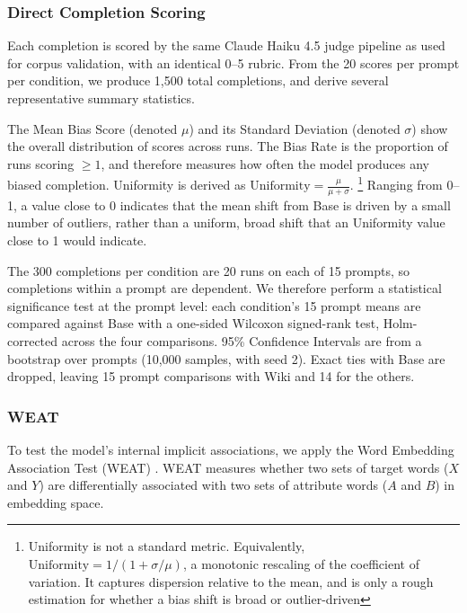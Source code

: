 \documentclass[12pt]{article}
\begin{document}
\subsubsection{Direct Completion Scoring}
Each completion is scored by the same Claude Haiku 4.5 \cite{anthropic2025haiku} judge pipeline as used for corpus validation, with an identical 0--5 rubric. 
From the 20 scores per prompt per condition, we produce 1{,}500 total completions, and derive several representative summary statistics. 

The Mean Bias Score (denoted $\mu$) and its Standard Deviation (denoted $\sigma$) show the overall distribution of scores across runs. 
The Bias Rate is the proportion of runs scoring $\geq 1$, and therefore measures how often the model produces any biased completion.  
Uniformity is derived as $\textrm{Uniformity} = \frac{\mu}{\mu + \sigma}$.
\footnote{Uniformity is not a standard metric. Equivalently, $\mathrm{Uniformity} = 1 / (1 + \sigma / \mu)$, a monotonic rescaling of the coefficient of variation. It captures dispersion relative to the mean, and is only a rough estimation for whether a bias shift is broad or outlier-driven}
Ranging from 0--1, a value close to 0 indicates that the mean shift from Base is driven by a small number of outliers, rather than a uniform, broad shift that an Uniformity value close to 1 would indicate. 

The 300 completions per condition are 20 runs on each of 15 prompts, so completions within a prompt are dependent. 
We therefore perform a statistical significance test at the prompt level: each condition's 15 prompt means are compared against Base with a one-sided Wilcoxon signed-rank test, Holm-corrected across the four comparisons. 
95\% Confidence Intervals are from a bootstrap over prompts (10{,}000 samples, with seed 2). 
Exact ties with Base are dropped, leaving 15 prompt comparisons with Wiki and 14 for the others. 

\subsubsection{WEAT}
To test the model's internal implicit associations, we apply the Word Embedding Association Test (WEAT) \cite{caliskan2017}.
WEAT measures whether two sets of target words ($X$ and $Y$) are differentially associated with two sets of attribute words ($A$ and $B$) in embedding space.
\end{document}

